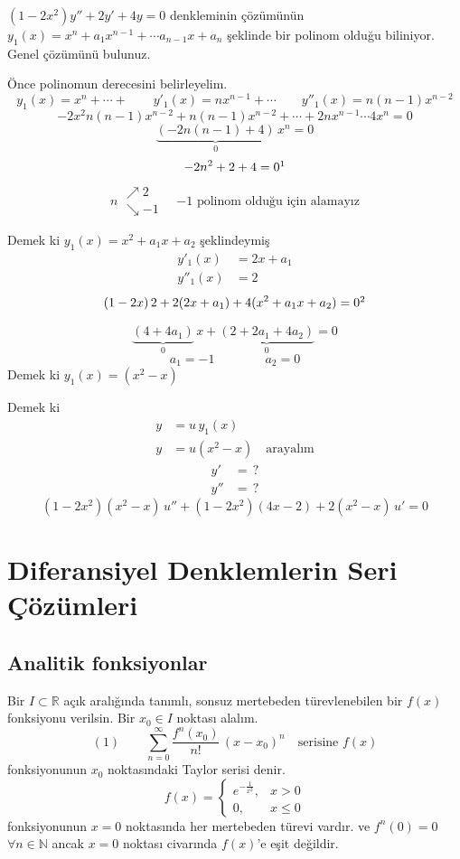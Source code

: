 \documentclass[11pt,a4paper]{article}
\begin{document}
\begin{ornek}
$(1-2x^2)y'' + 2y' + 4y = 0$ denkleminin çözümünün $y_1(x) = x^n + a_1x^{n-1} + \cdots a_{n-1}x + a_n$ şeklinde bir polinom olduğu biliniyor. Genel çözümünü bulunuz.
\end{ornek}
Önce polinomun derecesini belirleyelim.
\[ y_1(x) = x^n + \cdots + \qquad y'_1(x) = nx^{n-1} + \cdots \qquad y''_1(x) = n(n-1)x^{n-2} \]
\[ -2x^2n(n-1)x^{n-2} + n(n-1)x^{n-2} + \cdots + 2nx^{n-1} \cdots 4x^n = 0 \]
\[ \underbrace{(-2n(n-1)+4)}_{0}\,x^n = 0 \]
\[ -2n^2 + 2 + 4 = 0\footnotemark \]
\[ n \begin{array}{l} \nearrow 2\\ \searrow -1 \end{array} \quad \text{$-1$ polinom olduğu için alamayız} \]

Demek ki \quad $y_1(x) = x^2 + a_1x + a_2$ \quad şeklindeymiş
\begin{align*}
y'_1(x) &= 2x + a_1\\
y''_1(x) &= 2
\end{align*}
\[ (1-2x)\,2 + 2(2x+a_1) + 4(x^2+a_1x+a_2) = 0\footnotemark \]

\[ \underbrace{(4+4a_1)}_{0}\,x + \underbrace{(2+2a_1+4a_2)}_{0} = 0 \]
\[ a_1 = -1 \qquad\qquad a_2 = 0 \]
Demek ki \quad $y_1(x) = (x^2-x)$

Demek ki
\begin{align*}
y &= u\,y_1(x)\\
y &= u(x^2-x) \quad \text{arayalım}
\end{align*}
\begin{align*}
y' &= \,?\\
y'' &= \,?
\end{align*}
\[ (1-2x^2)(x^2-x)\,u'' + (1-2x^2)(4x-2) + 2(x^2-x)\,u' = 0 \]

\section{Diferansiyel Denklemlerin Seri Çözümleri}
\subsection{Analitik fonksiyonlar}
Bir $I\subset\mathbb{R}$ açık aralığında tanımlı, sonsuz mertebeden türevlenebilen bir $f(x)$ fonksiyonu verilsin. Bir $x_0\in I$ noktası alalım.
\[ (1)\qquad \sum_{n=0}^{\infty} \frac{f^{n}(x_0)}{n!}\,(x-x_0)^n \quad \text{serisine } f(x) \]
fonksiyonunun $x_0$ noktasındaki Taylor serisi denir.
\[ f(x) = \begin{cases} e^{-\frac{1}{x^2}}, & x>0\\ 0, & x\le 0 \end{cases} \]
fonksiyonunun $x=0$ noktasında her mertebeden türevi vardır. ve $f^{n}(0)=0$ \ $\forall n\in\mathbb{N}$ ancak $x=0$ noktası civarında $f(x)$'e eşit değildir.
\end{document}
